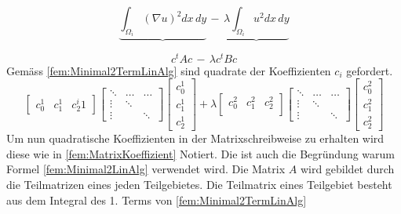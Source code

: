 \begin{equation}
			\underbrace{ \int_{\Omega_i} (\nabla u)^2 dx \, dy} \, -  \, \underbrace{\lambda \int_{\Omega_i} u^2 dx \,dy}
			\label{fem:Minimal2TermLinAlg}
\end{equation}

\begin{equation}
			c^t Ac \, - \, \lambda c^t Bc
			\label{fem:Minimal2LinAlg}
\end{equation}
Gemäss \eqref{fem:Minimal2TermLinAlg} sind quadrate der Koeffizienten $c_i$ gefordert. 
\begin{equation}
\begin{bmatrix}
c_0^1 &  c_1^1 &  c_2^i1  
\end{bmatrix}
\begin{bmatrix}
\ddots & \dots &  \dots    \\
\vdots & \ddots &   \\
\vdots &  & \ddots
\end{bmatrix}
\begin{bmatrix}
c_0^1  \\
c_1^1 \\
c_2^1
\end{bmatrix}
+
\lambda
\begin{bmatrix}
c_0^2 &  c_1^2 &  c_2^2    \\   
\end{bmatrix}
\begin{bmatrix}
\ddots & \dots &  \dots    \\
\vdots & \ddots &   \\
\vdots &  & \ddots
\end{bmatrix}
\begin{bmatrix}
c_0^2  \\
c_1^2 \\
c_2^2
\end{bmatrix}
	\label{fem:MatrixKoeffizient}
\end{equation}
Um nun quadratische Koeffizienten in der Matrixschreibweise zu erhalten wird diese wie in \eqref{fem:MatrixKoeffizient} Notiert. Die ist auch die Begründung warum Formel \eqref{fem:Minimal2LinAlg} verwendet wird.
Die Matrix $A$ wird gebildet durch die Teilmatrizen eines jeden Teilgebietes. Die Teilmatrix eines Teilgebiet besteht  aus dem Integral des 1. Terms von \eqref{fem:Minimal2TermLinAlg} 

